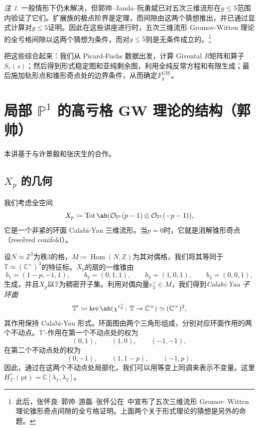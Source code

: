 \documentclass{amsart}
\theoremstyle{definition}
\theoremstyle{remark}
\newtheorem{rmk}[thm]{注}
\theoremstyle{plain}
\theoremstyle{definition}
\theoremstyle{remark}
\newcommand{\C}{\mathbb{C}}
\newcommand{\Z}{\mathbb{Z}}
\renewcommand{\P}{\mathbb{P}}
\newcommand{\mc}[1]{\mathcal{#1}}
\newcommand{\T}{\mathbb{T}}
\newcommand{\mr}[1]{\mathrm{#1}}
\newcommand{\on}[1]{\operatorname{#1}}
\newcommand{\1}{\mathbf{1}}
\newcommand{\2}{\mathbf{2}}
\newcommand{\3}{\mathbf{3}}
\DeclareMathOperator{\Hom}{Hom}
\begin{document}
\begin{rmk}
    一般情形下仍未解决，但郭帅--Janda--阮勇斌已对五次三维流形在\(g \leq 5\)范围内验证了它们。扩展族的极点阶界是定理，而间隙由这两个猜想推出，并已通过显式计算对\(g \leq 5\)证明。因此在这些讲座进行时，五次三维流形 Gromov-Witten 理论的全亏格间隙以这两个猜想为条件，而对\(g \leq 5\)则是无条件成立的。\footnote{此后，张怀良--郭帅--游磊--张怀公在~\cite{CGYZ2026}中宣布了五次三维流形 Gromov--Witten 理论锥形奇点间隙的全亏格证明。上面两个关于形式理论的猜想是另外的命题。}
\end{rmk}

把这些综合起来：我们从 Picard-Fuchs 数据出发，计算 Givental \(R\)矩阵和算子\(S_{\tau}(z)\)；然后得到形式稳定图和亚纯剩余图，利用全纯反常方程和有限生成；最后施加轨形点和锥形奇点处的边界条件，从而确定\(F_g^{\mr{GW}}\)。

\section{\texorpdfstring{局部 \(\P^1\) 的高亏格 GW 理论的结构}{局部 P1 的高亏格 GW 理论的结构}（郭帅）}%
\label{sec:Structure of higher-genus GW theory of local P1 (Shuai Guo)}

本讲基于与许景毅和张庆生的合作。

\subsection{\(X_p\) 的几何}%
\label{sub:The geometry of Xp}

我们考虑全空间
\[ X_p \coloneqq \on{Tot}\ab(\mc{O}_{\P^1}(p-1) \oplus \mc{O}_{\P^1}(-p-1)), \]
它是一个非紧的环面 Calabi-Yau 三维流形。当\(p = 0\)时，它就是消解锥形奇点（resolved conifold）。

设\(N \simeq \Z^3\)为秩\(3\)的格，\(M \coloneqq \Hom(N,\Z)\)为其对偶格，我们将其等同于\(\T \simeq (\C^{\times})^3\)的特征标。\(X_p\)的扇的一维锥由
\[ b_1 = (1-p,-1,1), \qquad b_2 = (0,1,1), \qquad b_3 = (1,0,1), \qquad b_4 = (0,0,1), \]
生成，并且\(X_p\)以\(\T\)为稠密开子集。利用对偶向量\(e_3^{\vee} \in M\)，我们得到\textit{Calabi-Yau 子环面}
\[ \T' \coloneqq \ker\ab(\chi^{e_3^{\vee}} \colon \T \to \C^{\times}) \simeq (\C^{\times})^2, \]
其作用保持 Calabi-Yau 形式。环面图由两个三角形组成，分别对应环面作用的两个不动点。\(\T'\)-作用在第一个不动点处的权为
\[ (0,1), \qquad (1,0), \qquad (-1,-1), \]
在第二个不动点处的权为
\[ (0,-1), \qquad (1,1-p), \qquad (-1,p). \]
因此，通过在这两个不动点处局部化，我们可以用等变上同调来表示不变量。这里\(H^*_{\T'}(\mr{pt}) = \C[\lambda_1,\lambda_2]\)。
\end{document}
